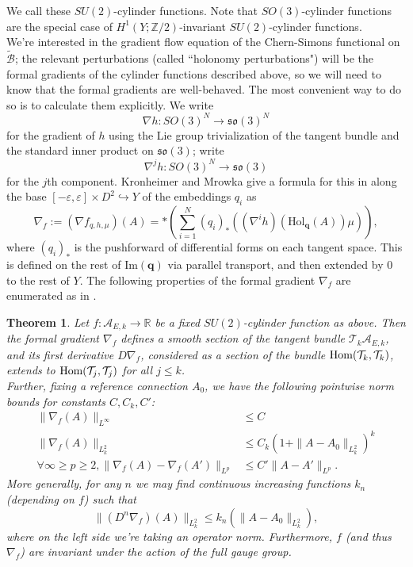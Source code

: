 \documentclass[10pt,a4paper]{amsart}
\newtheorem{theorem}{Theorem}
\theoremstyle{definition}
\theoremstyle{remark}
\numberwithin{figure}{qchap}
\begin{document}
We call these $SU(2)$-cylinder functions. Note that $SO(3)$-cylinder functions are the special case of $H^1(Y;\mathbb Z/2)$-invariant $SU(2)$-cylinder functions.\\

We're interested in the gradient flow equation of the Chern-Simons functional on $\widetilde{\mathcal B}$; the relevant perturbations (called ``holonomy perturbations") will be the formal gradients of the cylinder functions described above, so we will need to know that the formal gradients are well-behaved. The most convenient way to do so is to calculate them explicitly. We write 
$$\nabla h: SO(3)^N \to \mathfrak{so}(3)^N$$ 
for the gradient of $h$ using the Lie group trivialization of the tangent bundle and the standard inner product on $\mathfrak{so}(3)$; write 
$$\nabla^j h: SO(3)^N \to \mathfrak{so}(3)$$ 
for the $j$th component. Kronheimer and Mrowka give a formula for this in \cite[Equation~(74)]{KM1} along the base $[-\varepsilon, \varepsilon] \times D^2 \hookrightarrow Y$ of the embeddings $q_i$ as $$\nabla_f := (\nabla f_{q,h,\mu})(A) = \ast \left(\sum_{i=1}^N (q_i)_* ((\nabla^i h)(\text{Hol}_{\mathbf{q}}(A)) \mu)\right),$$ where $(q_i)_*$ is the pushforward of differential forms on each tangent space. This is defined on the rest of $\text{Im}(\mathbf{q})$ via parallel transport, and then extended by 0 to the rest of $Y$. The following properties of the formal gradient $\nabla_f$ are enumerated as in \cite[Proposition~3.5]{KM1}.

\begin{theorem}\label{pert}Let $f: \mathcal A_{E,k}\to \mathbb R$ be a fixed $SU(2)$-cylinder function as above. Then the formal gradient $\nabla_f$ defines a smooth section of the tangent bundle $\mathcal T_k \mathcal A_{E,k}$, and its first derivative $D\nabla_f$, considered as a section of the bundle $\textup{Hom}(\mathcal T_k, \mathcal T_k)$, extends to $\textup{Hom}(\mathcal T_j, \mathcal T_j)$ for all $j \leq k$.\\
Further, fixing a reference connection $A_0$, we have the following pointwise norm bounds for constants $C, C_k, C'$:
\begin{align*}\|\nabla_f(A)\|_{L^\infty} &\leq C \\
\|\nabla_f(A)\|_{L^2_k} &\leq C_k(1+\|A-A_0\|_{L^2_k})^k\\
\forall \infty \geq p\geq 2, \|\nabla_f(A) - \nabla_f(A')\|_{L^p} &\leq C' \|A - A'\|_{L^p}.
\end{align*}
More generally, for any $n$ we may find continuous increasing functions $k_n$ (depending on $f$) such that $$\|(D^n \nabla_f)(A)\|_{L^2_k} \leq k_n(\|A - A_0\|_{L^2_k}),$$ where on the left side we're taking an operator norm. Furthermore, $f$ (and thus $\nabla_f$) are invariant under the action of the full gauge group.
\end{theorem}
\end{document}
